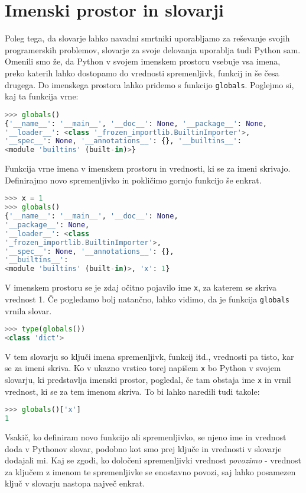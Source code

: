 \section{Imenski prostor in slovarji}
Poleg tega, da slovarje lahko navadni smrtniki uporabljamo za reševanje svojih programerskih problemov, slovarje za svoje delovanja uporablja tudi Python sam. Omenili smo že, da Python v svojem imenskem prostoru vsebuje vsa imena, preko katerih lahko dostopamo do vrednosti spremenljivk, funkcij in še česa drugega. Do imenskega prostora lahko pridemo s funkcijo \texttt{globals}. Poglejmo si, kaj ta funkcija vrne:
\begin{lstlisting}[language=Python]
>>> globals()
{'__name__': '__main__', '__doc__': None, '__package__': None, 
'__loader__': <class '_frozen_importlib.BuiltinImporter'>, 
'__spec__': None, '__annotations__': {}, '__builtins__':
<module 'builtins' (built-in)>}
\end{lstlisting}
Funkcija vrne imena v imenskem prostoru in vrednosti, ki se za imeni skrivajo. Definirajmo novo spremenljivko in pokličimo gornjo funkcijo še enkrat.
\begin{lstlisting}[language=Python]
>>> x = 1
>>> globals()
{'__name__': '__main__', '__doc__': None,
'__package__': None, 
'__loader__': <class
'_frozen_importlib.BuiltinImporter'>, 
'__spec__': None, '__annotations__': {},
'__builtins__':
<module 'builtins' (built-in)>, 'x': 1}
\end{lstlisting}
V imenskem prostoru se je zdaj očitno pojavilo ime \texttt{x}, za katerem se skriva vrednost 1. Če pogledamo bolj natančno, lahko vidimo, da je funkcija \texttt{globals} vrnila slovar.
\begin{lstlisting}[language=Python]
>>> type(globals())
<class 'dict'>
\end{lstlisting}
V tem slovarju so ključi imena spremenljivk, funkcij itd., vrednosti pa tisto, kar se za imeni skriva. Ko v ukazno vrstico torej napišem \texttt{x} bo Python v svojem slovarju, ki predstavlja imenski prostor, pogledal, če tam obstaja ime \texttt{x} in vrnil vrednost, ki se za tem imenom skriva. To bi lahko naredili tudi takole:
\begin{lstlisting}[language=Python]
>>> globals()['x']
1
\end{lstlisting}
Vsakič, ko definiram novo funkcijo ali spremenljivko, se njeno ime in vrednost doda v Pythonov slovar, podobno kot smo prej ključe in vrednosti v slovarje dodajali mi. Kaj se zgodi, ko določeni spremenljivki vrednost \emph{povozimo} - vrednost za ključem z imenom te spremenljivke se enostavno povozi, saj lahko posamezen ključ v slovarju nastopa največ enkrat.
